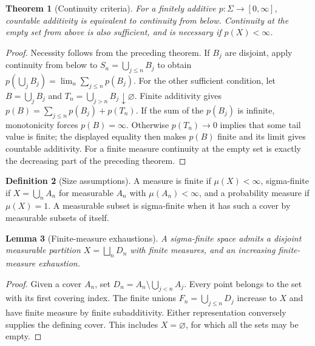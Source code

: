 \documentclass[11pt,oneside,openany]{book}
\newtheorem{theorem}{Theorem}[chapter]
\newtheorem{lemma}[theorem]{Lemma}
\theoremstyle{definition}
\newtheorem{definition}[theorem]{Definition}
\theoremstyle{remark}
\newcommand{\Eplus}{[0,\infty]}
\newcommand{\family}[1]{}
\begin{document}
\begin{theorem}[Continuity criteria]
\family{D11.01.countable_additivity_criterion}\label{d11:01:countable-additivity-criterion}
For a finitely additive $p:\Sigma\to\Eplus$, countable additivity is
equivalent to continuity from below. Continuity at the empty set from above
is also sufficient, and is necessary if $p(X)<\infty$.
\end{theorem}
\begin{proof}
Necessity follows from the preceding theorem. If $B_j$ are disjoint, apply
continuity from below to $S_n=\bigcup_{j\leq n}B_j$ to obtain
$p(\bigcup_jB_j)=\lim_n\sum_{j\leq n}p(B_j)$.
For the other sufficient condition, let $B=\bigcup_jB_j$ and
$T_n=\bigcup_{j>n}B_j\downarrow\varnothing$. Finite additivity gives
$p(B)=\sum_{j\leq n}p(B_j)+p(T_n)$. If the sum of the $p(B_j)$ is infinite,
monotonicity forces $p(B)=\infty$. Otherwise $p(T_n)\to0$ implies that some
tail value is finite; the displayed equality then makes $p(B)$ finite and
its limit gives countable additivity. For a finite measure continuity at
the empty set is exactly the decreasing part of the preceding theorem.
\end{proof}

\begin{definition}[Size assumptions]
\family{D11.01.finite_sigma_finite}\label{d11:01:finite-sigma-finite}
A measure is finite if $\mu(X)<\infty$, sigma-finite if
$X=\bigcup_n A_n$ for measurable $A_n$ with $\mu(A_n)<\infty$, and a
probability measure if $\mu(X)=1$. A measurable subset is sigma-finite when
it has such a cover by measurable subsets of itself.
\end{definition}

\begin{lemma}[Finite-measure exhaustions]
\family{D11.01.sigma_finite_exhaustion}\label{d11:01:sigma-finite-exhaustion}
A sigma-finite space admits a disjoint measurable partition $X=\bigsqcup_nD_n$
with finite measures, and an increasing finite-measure exhaustion.
\end{lemma}
\begin{proof}
Given a cover $A_n$, set $D_n=A_n\setminus\bigcup_{j<n}A_j$.
Every point belongs to the set with its first covering index. The finite unions
$F_n=\bigcup_{j\leq n}D_j$ increase to $X$ and have finite measure by finite
subadditivity. Either representation conversely supplies the defining cover.
This includes $X=\varnothing$, for which all the sets may be empty.
\end{proof}
\end{document}
